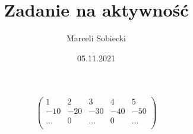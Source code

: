 \documentclass[12pt,legalpaper,notitlepage]{article}
\title{Zadanie na aktywność}
\author{Marceli Sobiecki}
\date{05.11.2021}
\begin{document}
\maketitle

$$
\left(
\begin{array}{ccccc}
1 & 2 & 3 & 4 & 5 \\
-10 & -20 & -30 & -40 & -50 \\
\ldots & 0 & \ldots & 0 & \ldots \\
\end{array} \right)
$$
\end{document}
